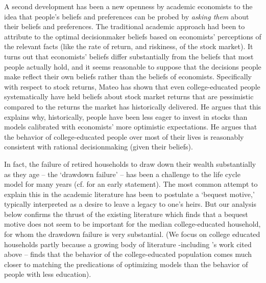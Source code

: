 \documentclass{article}
\begin{document}
A second development has been a new openness by academic economists to the idea that people's beliefs and preferences can be probed by \textit{asking them} about their beliefs and preferences. The traditional academic approach had been to attribute to the optimal decisionmaker beliefs based on economists' perceptions of the relevant facts (like the rate of return, and riskiness, of the stock market). It turns out that economists' beliefs differ substantially from the beliefs that most people actually hold, and it seems reasonable to suppose that the decisions people make reflect their own beliefs rather than the beliefs of economists. Specifically with respect to stock returns, Mateo \cite{velasquez-giraldoJMP} has shown that even college-educated people systematically have held beliefs about stock market returns that are pessimistic compared to the returns the market has historically delivered. He argues that this explains why, historically, people have been less eager to invest in stocks than models calibrated with economists' more optimistic expectations. He argues that the behavior of college-educated people over most of their lives is reasonably consistent with rational decisionmaking (given their beliefs).


In fact, the failure of retired households to draw down their wealth substantially as they age -- the `drawdown failure' -- has been a challenge to the life cycle model for many years (cf. \cite{hurd1987savings} for an early statement).  The most common attempt to explain this in the academic literature has been to postulate a `bequest motive,' typically interpreted as a desire to leave a legacy to one's heirs. But our analysis below confirms the thrust of the existing literature which finds that a bequest motive does not seem to be important for the median college-educated household, for whom the drawdown failure is very substantial.  (We focus on college educated households partly because a growing body of literature -including \cite{velasquez-giraldoJMP}'s work cited above -- finds that the behavior of the college-educated population comes much closer to matching the predications of optimizing models than the behavior of people with less education).
\end{document}
